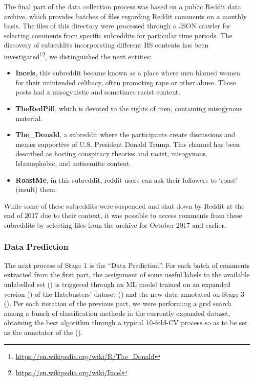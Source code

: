 \documentclass{article}
\begin{document}
The final part of the data collection process was based on a public Reddit data archive, which provides batches of files regarding Reddit comments on a monthly basis. The files of this directory were processed through a JSON crawler for selecting comments from specific subreddits for particular time periods. The discovery of subreddits incorporating different HS contents has been investigated\footnote{\url{https://en.wikipedia.org/wiki/R/The_Donald}}\footnote{\url{https://en.wikipedia.org/wiki/Incel}}, we distinguished the next entities:
\begin{itemize}
    \item \textbf{Incels}, this subreddit became known as a place where men blamed women for their unintended celibacy, often promoting rape or other abuse. Those posts had a misogynistic and sometimes racist content.
    \item \textbf{TheRedPill}, which is devoted to the rights of men, containing misogynous material.
    \item \textbf{The\_Donald}, a subreddit where the participants create discussions and memes supportive of U.S. President Donald Trump. This channel has been described as hosting conspiracy theories and racist, misogynous, Islamophobic, and antisemitic content.
    \item \textbf{RoastMe}, in this subreddit, reddit users can ask their followers to `roast' (insult) them.
\end{itemize}

While some of these subreddits were suspended and shut down by Reddit at the end of 2017 due to their context, it was possible to access comments from these subreddits by selecting files from the archive for October 2017 and earlier.

\subsubsection{Data Prediction}
The next process of Stage 1 is the ``Data Prediction''. For each batch of comments extracted from the first part, the assignment of some useful labels to the available unlabelled set () is triggered through an ML model trained on an expanded version () of the Hatebusters' dataset () and the new data annotated on Stage 3 (). Per each iteration of the previous part, we were performing a grid search among a bunch of classification methods in the currently expanded dataset, obtaining the best algorithm through a typical 10-fold-CV process so as to be set as the annotator of the ().
\end{document}
